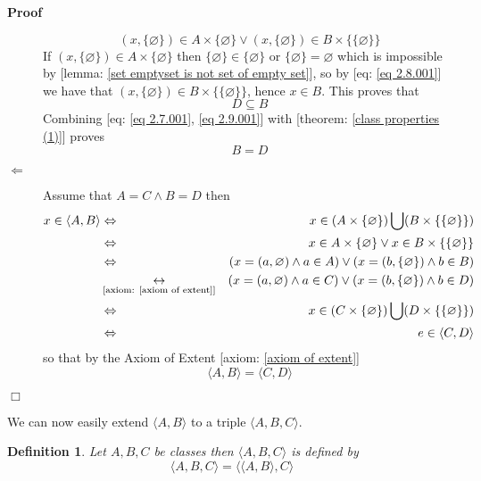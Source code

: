 \documentclass{book}
\newcommand{\Leftrightarrowlim}{\mathop{\leftrightarrow}\limits}
\newenvironment{proof}{\noindent\textbf{Proof\ }}{\hspace*{\fill}$\Box$\medskip}
\newtheorem{definition}{Definition}
{\theorembodyfont{\rmfamily}\newtheorem{example}{Example}}
\begin{document}
\begin{proof}
\begin{description}
\begin{equation}
      \label{eq 2.8.001} (x, \{ \varnothing \}) \in A \times \{ \varnothing \}
      \vee (x, \{ \varnothing \}) \in B \times \{ \{ \varnothing \} \}
    \end{equation}
    If $(x, \{ \varnothing \}) \in A \times \{ \varnothing \}$ then $\{
    \varnothing \} \in \{ \varnothing \}$ or $\{ \varnothing \} = \varnothing$
    which is impossible by [lemma: \ref{set emptyset is not set of empty
    set}], so by [eq: \ref{eq 2.8.001}] we have that $(x, \{ \varnothing \})
    \in B \times \{ \{ \varnothing \} \}$, hence $x \in B$. This proves that
    \begin{equation}
      \label{eq 2.9.001} D \subseteq B
    \end{equation}
    Combining [eq: \ref{eq 2.7.001}, \ref{eq 2.9.001}] with [theorem:
    \ref{class properties (1)}] proves
    \[ B = D \]
    \item[$\Leftarrow$] Assume that $A = C \wedge B = D$ then
    \begin{eqnarray*}
      x \in \langle A, B \rangle & \Leftrightarrow & x \in (A \times \{
      \varnothing \}) \bigcup (B \times \{ \{ \varnothing \} \})\\
      & \Leftrightarrow & x \in A \times \{ \varnothing \} \vee x \in B
      \times \{ \{ \varnothing \} \}\\
      & \Leftrightarrow & (x = (a, \varnothing) \wedge a \in A) \vee (x = (b,
      \{ \varnothing \}) \wedge b \in B)\\
      & \Leftrightarrowlim_{\text{[axiom: \ref{axiom of extent}]}} & (x = (a,
      \varnothing) \wedge a \in C) \vee (x = (b, \{ \varnothing \}) \wedge b
      \in D)\\
      & \Leftrightarrow & x \in (C \times \{ \varnothing \}) \bigcup (D
      \times \{ \{ \varnothing \} \})\\
      & \Leftrightarrow & e \in \langle C, D \rangle
    \end{eqnarray*}
    so that by the Axiom of Extent [axiom: \ref{axiom of extent}]
    \[ \langle A, B \rangle = \langle C, D \rangle \]
  \end{description}
\end{proof}

We can now easily extend $\langle A, B \rangle$ to a triple $\langle A, B, C
\rangle$.

\begin{definition}
  {}Let $A, B, C$ be classes then $\langle A,
  B, C \rangle$ is defined by
  \[ \langle A, B, C \rangle = \langle \langle A, B \rangle, C \rangle \]
\end{definition}
\end{document}
